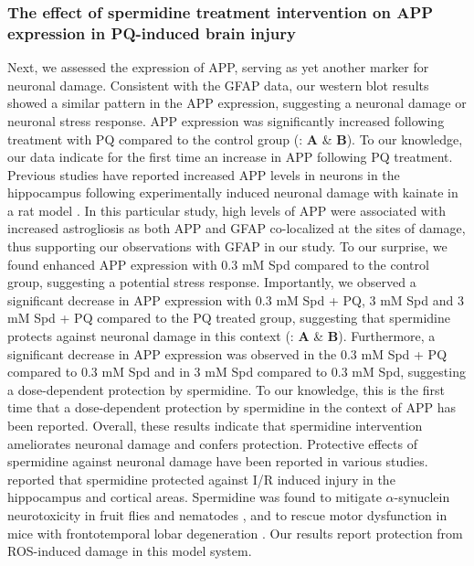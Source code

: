 \subsubsection{The effect of spermidine treatment intervention on APP expression in PQ-induced brain injury}
Next, we assessed the expression of APP, serving as yet another marker for neuronal damage. Consistent with the GFAP data, our western blot results showed a similar pattern in the APP expression, suggesting a neuronal damage or neuronal stress response. APP expression was significantly increased following treatment with PQ compared to the control group (: \textbf{A} \& \textbf{B}). To our knowledge, our data indicate for the first time an increase in APP following PQ treatment. Previous studies have reported increased APP levels in neurons in the hippocampus following experimentally induced neuronal damage with kainate in a rat model \citep{Siman1989}. In this particular study, high levels of APP were associated with increased astrogliosis as both APP and GFAP co-localized at the sites of damage, thus supporting our observations with GFAP in our study. To our surprise, we found enhanced APP expression with 0.3 mM Spd compared to the control group, suggesting a potential stress response. Importantly, we observed a significant decrease in APP expression with 0.3 mM Spd + PQ, 3 mM Spd and 3 mM Spd + PQ compared to the PQ treated group, suggesting that spermidine protects against neuronal damage in this context (: \textbf{A} \& \textbf{B}). Furthermore, a significant decrease in APP expression was observed in the 0.3 mM Spd + PQ compared to 0.3 mM Spd and in 3 mM Spd compared to 0.3 mM Spd, suggesting a dose-dependent protection by spermidine. To our knowledge, this is the first time that a dose-dependent protection by spermidine in the context of APP has been reported. Overall, these results indicate that spermidine intervention ameliorates neuronal damage and confers protection. Protective effects of spermidine against neuronal damage have been reported in various studies. \citet{Yang2017} reported that spermidine protected against I/R induced injury in the hippocampus and cortical areas. Spermidine was found to mitigate $\alpha$-synuclein neurotoxicity in fruit flies and nematodes \citep{Buttner2014}, and to rescue motor dysfunction in mice with frontotemporal lobar degeneration \citep{Wang2012}. Our results report protection from ROS-induced damage in this model system.


